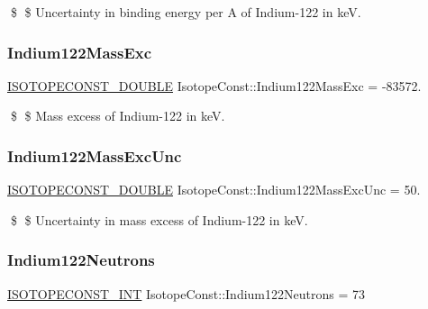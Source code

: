 \$ \$ Uncertainty in binding energy per A of Indium-\/122 in keV. \mbox{\label{group___isotope_const-_indium-_in122_ga7515cf5147357b000cf779a6b0b61566}} 
\subsubsection{\texorpdfstring{Indium122\+Mass\+Exc}{Indium122MassExc}}
{\footnotesize\ttfamily \mbox{\hyperlink{group___isotope_const-_macros_ga8f45a7272ce02c0b4c65c44636ed719a}{I\+S\+O\+T\+O\+P\+E\+C\+O\+N\+S\+T\+\_\+\+D\+O\+U\+B\+LE}} Isotope\+Const\+::\+Indium122\+Mass\+Exc = -\/83572.}

\$ \$ Mass excess of Indium-\/122 in keV. \mbox{\label{group___isotope_const-_indium-_in122_gabb4dd455edc563cd0da480ff49926bd0}} 
\subsubsection{\texorpdfstring{Indium122\+Mass\+Exc\+Unc}{Indium122MassExcUnc}}
{\footnotesize\ttfamily \mbox{\hyperlink{group___isotope_const-_macros_ga8f45a7272ce02c0b4c65c44636ed719a}{I\+S\+O\+T\+O\+P\+E\+C\+O\+N\+S\+T\+\_\+\+D\+O\+U\+B\+LE}} Isotope\+Const\+::\+Indium122\+Mass\+Exc\+Unc = 50.}

\$ \$ Uncertainty in mass excess of Indium-\/122 in keV. \mbox{\label{group___isotope_const-_indium-_in122_ga440d2ddc373f294b7cc1bcd33d08ddd8}} 
\subsubsection{\texorpdfstring{Indium122\+Neutrons}{Indium122Neutrons}}
{\footnotesize\ttfamily \mbox{\hyperlink{group___isotope_const-_macros_ga5f18360b3e99483a35c32d789e62621c}{I\+S\+O\+T\+O\+P\+E\+C\+O\+N\+S\+T\+\_\+\+I\+NT}} Isotope\+Const\+::\+Indium122\+Neutrons = 73}

